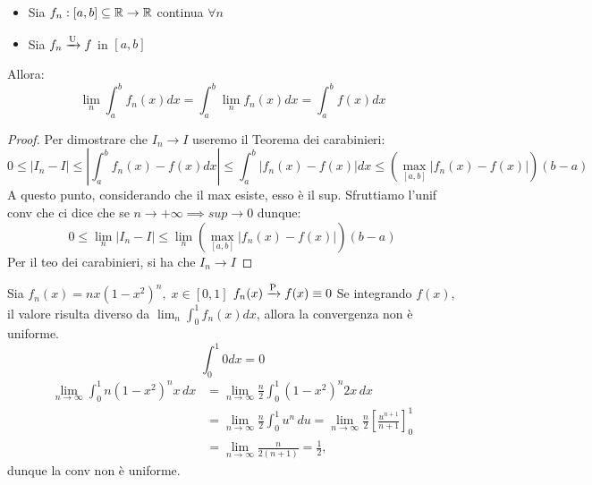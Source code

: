 \begin{theorem}
    \begin{itemize}
        \item Sia \(f_{n}: [a,b]\subseteq\mathbb{R} \to \mathbb{R}\) continua \(\forall n\)
        \item Sia \(f_{n}\xrightarrow{\mathrm{U}} f\) in \([a,b]\)
    \end{itemize}
    Allora: 
    \[
    \lim_{n} \int_{a}^{b} f_{n}(x) dx = \int_{a}^{b} \lim_{n} f_{n}(x) dx = \int_{a}^{b} f(x) dx
    \]
\end{theorem}
\begin{proof}
    Per dimostrare che \(I_{n}\to I\) useremo il Teorema dei carabinieri:
    \[
    0\leq |I_{n} - I| \leq | \int_{a}^{b} f_{n}(x) - f(x) dx| \leq \int_{a}^{b} |f_{n}(x) - f(x)| dx \leq (\max_{[a,b]}|f_{n}(x) - f(x)|)(b-a)
    \]
    A questo punto, considerando che il max esiste, esso è il sup. Sfruttiamo l'unif conv che ci dice che se \(n \to +\infty \implies sup \to 0 \) dunque:
    \[
    0 \leq \lim_{n} |I_{n} -I| \leq \lim_{n} (\max_{[a,b]}|f_{n}(x) - f(x)|)(b-a)
    \]
    Per il teo dei carabinieri, si ha che \(I_{n}\to I\)
\end{proof}


\begin{example}
    Sia \(f_{n}(x) = nx(1-x^2)^n,\; x\in[0,1]\)
    \(f_{n}(x)\xrightarrow{\mathrm{P}}f(x)\equiv 0\) 
    Se integrando \(f(x)\), il valore risulta diverso da \(\lim_{n}\int_{0}^{1}f_{n}(x) dx\), allora la convergenza non è uniforme.
    \[
    \int_{0}^{1} 0 dx = 0
    \]
    \[
    \begin{aligned}
    \lim_{n\to\infty}\int_0^1 n(1-x^2)^n x\,dx
    &=\lim_{n\to\infty}\frac {n}{2}\int_0^1(1-x^2)^n2x\,dx\\
    &=\lim_{n\to\infty}\frac {n}{2}\int_0^1u^n\,du
    =\lim_{n\to\infty}\frac {n}{2}\left[\frac{u^{n+1}}{n+1}\right]_0^1\\
    &=\lim_{n\to\infty}\frac{n}{2(n+1)}
    =\boxed{\frac{1}{2}},
    \end{aligned}
    \]
    dunque la conv non è uniforme.    
\end{example}

